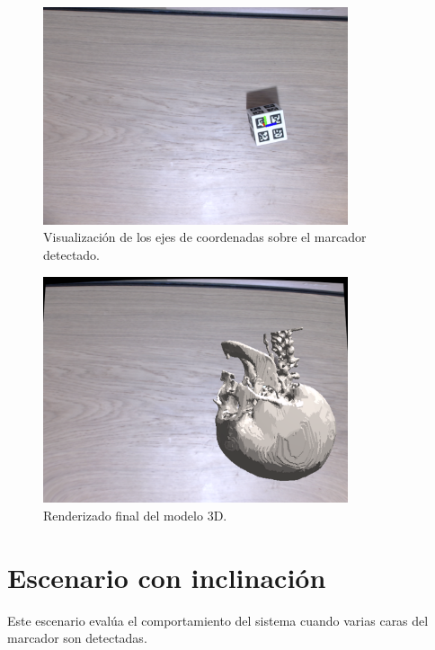 \begin{figure}[H]
	\centering
	\includegraphics[width=0.8\textwidth]{imaxes/unobstructed_cube_axis.png}
	\caption{Visualización de los ejes de coordenadas sobre el marcador detectado.}
	\label{fig:unobstructed_axes}
\end{figure}

\begin{figure}[H]
	\centering
	\includegraphics[width=0.8\textwidth]{imaxes/unobstructed_opengl_render.png}
	\caption{Renderizado final del modelo 3D.}
	\label{fig:unobstructed_render}
\end{figure}

\section{Escenario con inclinación}
\label{sec:tilted}

Este escenario evalúa el comportamiento del sistema cuando varias caras del marcador son detectadas.


